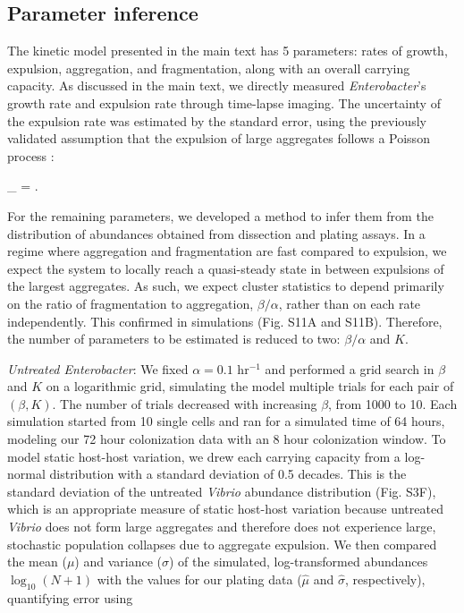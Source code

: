 \subsection*{Parameter inference}
The kinetic model presented in the main text has 5 parameters: rates of growth, expulsion, aggregation, and fragmentation, along with an overall carrying capacity. As discussed in the main text, we directly measured \textit{Enterobacter}'s growth rate and expulsion rate through time-lapse imaging. The uncertainty of the expulsion rate was estimated by the standard error, using the previously validated assumption that the expulsion of large aggregates follows a Poisson process \cite{Wiles2016}:

\be
{}_{\lambda} = .
\ee

For the remaining parameters, we developed a method to infer them from the distribution of abundances obtained from dissection and plating assays. In a regime where aggregation and fragmentation are fast compared to expulsion, we expect the system to locally reach a quasi-steady state in between expulsions of the largest aggregates. As such, we expect cluster statistics to depend primarily on the ratio of fragmentation to aggregation, $\beta/\alpha$, rather than on each rate independently. This confirmed in simulations (Fig. S11A and S11B). Therefore, the number of parameters to be estimated is reduced to two: $\beta/\alpha$ and $K$. 

\textit{Untreated Enterobacter}:  We fixed $\alpha = 0.1$ hr$^{-1}$ and performed a grid search in $\beta$ and $K$ on a logarithmic grid, simulating the model multiple trials for each pair of $(\beta,K)$. The number of trials decreased with increasing $\beta$, from 1000 to 10. Each simulation started from 10 single cells and ran for a simulated time of 64 hours, modeling our 72 hour colonization data with an 8 hour colonization window. To model static host-host variation, we drew each carrying capacity from a log-normal distribution with a standard deviation of 0.5 decades. This is the standard deviation of the untreated \textit{Vibrio} abundance distribution (Fig. S3F), which is an appropriate measure of static host-host variation because untreated \textit{Vibrio} does not form large aggregates and therefore does not experience large, stochastic population collapses due to aggregate expulsion. We then compared the mean ($\mu$) and variance ($\sigma$) of the simulated, log-transformed abundances $\log_{10}(N+1)$ with the values for our plating data ($\hat{\mu}$ and $\hat{\sigma}$, respectively), quantifying error using 

